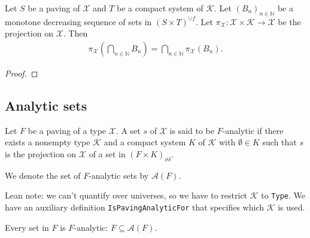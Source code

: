 \begin{theorem}\label{thm:fst_iInter_of_supClosure_image2_prod_of_antitone}
  \leanok
Let $S$ be a paving of $\mathcal{X}$ and $T$ be a compact system of $\mathcal{K}$.
Let $(B_n)_{n \in \mathbb{N}}$ be a monotone decreasing sequence of sets in $(S \times T)^{\cup f}$.
Let $\pi_{\mathcal{X}} : \mathcal{X} \times \mathcal{K} \to \mathcal{X}$ be the projection on $\mathcal{X}$.
Then
\begin{align*}
  \pi_{\mathcal{X}}\left(\bigcap_{n\in\mathbb{N}} B_n\right) = \bigcap_{n\in\mathbb{N}} \pi_{\mathcal{X}}(B_n).
\end{align*}
\end{theorem}

\begin{proof}\leanok

\end{proof}




\subsection{Analytic sets}

\begin{definition}\label{def:IsPavingAnalytic}
Let $F$ be a paving of a type $\mathcal{X}$.
A set $s$ of $\mathcal{X}$ is said to be $F$-analytic if there exists a nonempty type $\mathcal{K}$ and a compact system $K$ of $\mathcal{K}$ with $\emptyset \in K$ such that $s$ is the projection on $\mathcal{X}$ of a set in $(F \times K)_{\sigma \delta}$.

We denote the set of $F$-analytic sets by $\mathcal{A}(F)$.
\end{definition}

Lean note: we can't quantify over universes, so we have to restrict $\mathcal{K}$ to \texttt{Type}. We have an auxiliary definition \texttt{IsPavingAnalyticFor} that specifies which $\mathcal{K}$ is used.


\begin{lemma}\label{lem:isPavingAnalytic_of_prop}
  \leanok
Every set in $F$ is $F$-analytic: $F \subseteq \mathcal{A}(F)$.
\end{lemma}

